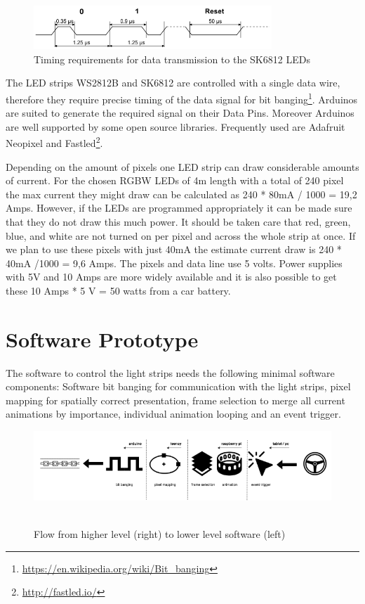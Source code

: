 \begin{figure}
    \includegraphics[width=0.8\textwidth]{fig/pololu}
    \caption[LED Specification]{Timing requirements for data transmission to the SK6812 LEDs}
    \label{fig:LEDspec}
\end{figure}

The LED strips WS2812B and SK6812 are controlled with a single data wire, therefore they require precise timing of the data signal for bit banging\footnote{\url{https://en.wikipedia.org/wiki/Bit_banging}}. Arduinos are suited to generate the required signal on their Data Pins. Moreover Arduinos are well supported by some open source libraries. Frequently used are Adafruit Neopixel and Fastled\footnote{\url{http://fastled.io/}}. 

Depending on the amount of pixels one LED strip can draw considerable amounts of current. For the chosen RGBW LEDs of 4m length with a total of 240 pixel the max current they might draw can be calculated as 240 * 80mA / 1000 = 19,2 Amps. However, if the LEDs are programmed appropriately it can be made sure that they do not draw this much power. It should be taken care that red, green, blue, and white are not turned on per pixel and across the whole strip at once. If we plan to use these pixels with just 40mA the estimate current draw is 240 * 40mA /1000 = 9,6 Amps. The pixels and data line use 5 volts. Power supplies with 5V and 10 Amps are more widely available and it is also possible to get these 10 Amps * 5 V = 50 watts from a car battery. 

\section{Software Prototype}
\label{section:software}
The software to control the light strips needs the following minimal software components:
Software bit banging for communication with the light strips, pixel mapping for spatially correct presentation, frame selection to merge all current animations by importance, individual animation looping and an event trigger. 

\begin{figure}
    \includegraphics[width=1\textwidth]{fig/softwareflow-}\hfill\
    \caption[Software Flow]{Flow from higher level (right) to lower level software (left)}
    \label{fig:flow}
\end{figure}

